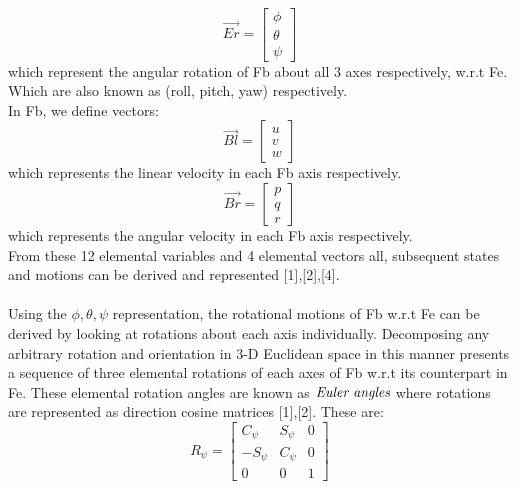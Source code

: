 \documentclass[12pt,a4paper,twoside]{report}
\begin{document}
			\\
			\begin{equation}
				\vec{Er} = 
				\begin{bmatrix}
					\phi \\
					\theta \\
					\psi
				\end{bmatrix}
			\end{equation}
			which represent the angular rotation of Fb about all 3 axes respectively, w.r.t Fe. Which are also known as (roll, pitch, yaw) respectively.
			\\
			In Fb, we define vectors:
			\\
			\begin{equation}
				\vec{Bl} = 
				\begin{bmatrix}
					u \\
					v \\
					w
				\end{bmatrix}
			\end{equation}
			which represents the linear velocity in each Fb axis respectively.
			\\
			\begin{equation}
				\vec{Br} = 
				\begin{bmatrix}
					p \\
					q \\
					r
				\end{bmatrix}
			\end{equation}
			which represents the angular velocity in each Fb axis respectively.
			\\
			From these 12 elemental variables and 4 elemental vectors all, subsequent states and motions can be derived and represented [1],[2],[4].
			\\ \\
			Using the \(\phi, \theta, \psi\) representation, the rotational motions of Fb w.r.t Fe can be derived by looking at rotations about each axis individually. Decomposing any arbitrary rotation and orientation in 3-D Euclidean space in this manner presents a sequence of three elemental rotations of each axes of Fb w.r.t its counterpart in Fe. These elemental rotation angles are known as $\emph{Euler angles}$  where rotations are represented as direction cosine matrices [1],[2]. These are:
			\\
			\begin{equation}
				R_\psi = 
				\begin{bmatrix}
					C_\psi & S_\psi & 0  \\
					-S_\psi & C_\psi & 0  \\
					0 & 0 & 1
				\end{bmatrix}
			\end{equation}
\end{document}
